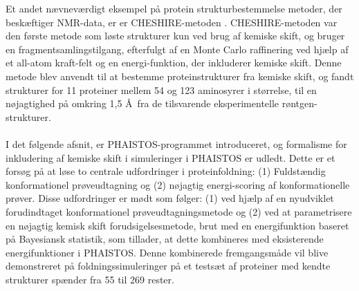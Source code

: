 Et andet nævneværdigt eksempel på protein strukturbestemmelse metoder, der beskæftiger NMR-data, er er CHESHIRE-metoden \cite{cheshire}. CHESHIRE-metoden var den første metode som løste strukturer kun ved brug af kemiske skift, og bruger en fragmentsamlingstilgang, efterfulgt af en Monte Carlo raffinering ved hjælp af et all-atom kraft-felt og en energi-funktion, der inkluderer kemiske skift. Denne metode blev anvendt til at bestemme proteinstrukturer fra kemiske skift, og fandt strukturer for 11 proteiner mellem 54 og 123 aminosyrer i størrelse, til en nøjagtighed på omkring 1,5 \AA~fra de tilsvarende eksperimentelle røntgen-strukturer.
\\\\I det følgende afsnit, er PHAISTOS-programmet introduceret, og formalisme for inkludering af kemiske skift i simuleringer i PHAISTOS er udledt. Dette er et forsøg på at løse
to centrale udfordringer i proteinfoldning: (1) Fuldstændig konformationel prøveudtagning og (2) nøjagtig energi-scoring af konformationelle prøver.
Disse udfordringer er mødt som følger: (1) ved hjælp af en nyudviklet forudindtaget konformationel prøveudtagningsmetode og (2) ved at parametrisere en nøjagtig kemisk skift forudsigelsesmetode, brut med en energifunktion baseret på Bayesiansk statistik, som tillader, at dette kombineres med eksisterende energifunktioner i PHAISTOS.
Denne kombinerede fremgangsmåde vil blive demonstreret på foldningssimuleringer på et testsæt af proteiner med kendte strukturer spænder fra 55 til 269 rester.
